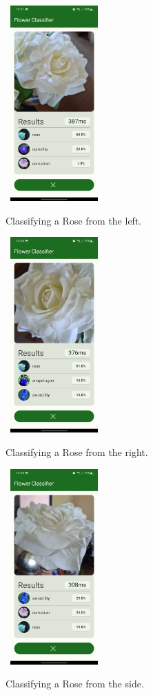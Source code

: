 \documentclass[12pt,a4paper]{report}
\begin{document}
\begin{figure}[h]\
    \includegraphics[width=0.3\textwidth]{rose_left.jpg}
    \caption{Classifying a Rose from the left.}
    \label{fig:rose_left}
\end{figure}

\begin{figure}[h]\
    \includegraphics[width=0.3\textwidth]{rose_right.jpg}
    \caption{Classifying a Rose from the right.}
    \label{fig:rose_right}
\end{figure}

\begin{figure}[h]\
    \includegraphics[width=0.3\textwidth]{rose_side.jpg}
    \caption{Classifying a Rose from the side.}
    \label{fig:rose_side}
\end{figure}
\end{document}
